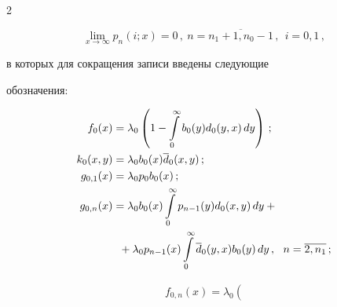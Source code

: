 \begin{multicols}{2}
\begin{equation}
\end{equation}




\begin{equation}


\label{3-beg-2-m}


\lim_{x\to\infty} p_n(i;x) = 0\,,


\ n=\overline{n_1+1,n_0-1}\,,\ \ i=0,1\,,


\end{equation}




в которых для сокращения записи введены сле\-ду\-ющие


обозначения:




\begin{align*}


f_0(x) &= \lambda_0 \left(


1 - \int\limits_0^\infty b_0(y) d_0(y,x)\, dy \right)\,;


\\


k_0(x,y) &= \lambda_0 b_0(x) \d_0(x,y) \,;


\\


g_{0,1}(x) &= \lambda_0 p_0 b_0(x) \,;\\


g_{0,n}(x) &= \lambda_0 b_0(x) \int\limits_0^\infty


p_{n-1}(y) d_0(x,y)\, dy +{}\\


&\hspace*{2mm}{}+


\lambda_0 p_{n-1}(x) \int\limits_0^\infty \d_0(y,x) b_0(y)\, dy\,,


\ \ n=\overline{2,n_1}\,;


\end{align*}







\vspace*{-24pt}





\noindent


\begin{multline*}


f_{0,n}(x)= \lambda_0 \left(



\end{multline*}
\end{multicols}
